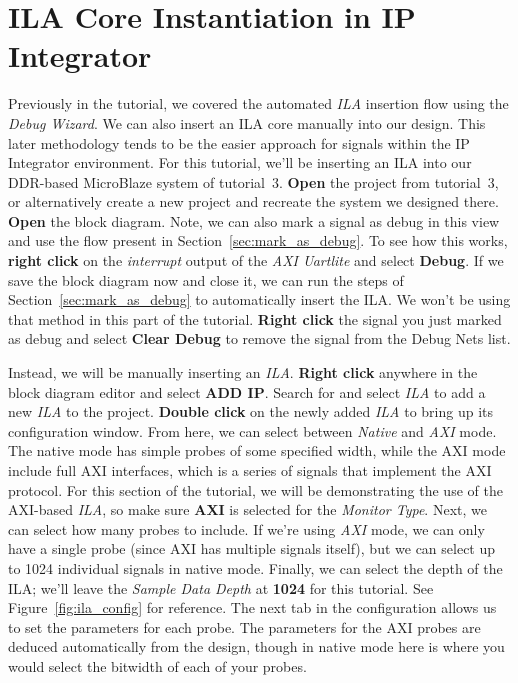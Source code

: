 \documentclass[11pt]{article}
\begin{document}
\section{ILA Core Instantiation in IP Integrator}
\label{sec:ila_core}
Previously in the tutorial, we covered the automated \textit{ILA} insertion flow using the \textit{Debug Wizard}. We can also insert an ILA core manually into our design. This later methodology tends to be the easier approach for signals within the IP Integrator environment. For this tutorial, we'll be inserting an ILA into our DDR-based MicroBlaze system of tutorial~3. \textbf{Open} the project from tutorial~3, or alternatively create a new project and recreate the system we designed there. \textbf{Open} the block diagram. Note, we can also mark a signal as debug in this view and use the flow present in Section~\ref{sec:mark_as_debug}. To see how this works, \textbf{right click} on the \textit{interrupt} output of the \textit{AXI Uartlite} and select \textbf{Debug}. If we save the block diagram now and close it, we can run the steps of Section~\ref{sec:mark_as_debug} to automatically insert the ILA. We won't be using that method in this part of the tutorial. \textbf{Right click} the signal you just marked as debug and select \textbf{Clear Debug} to remove the signal from the Debug Nets list.

Instead, we will be manually inserting an \textit{ILA}. \textbf{Right click} anywhere in the block diagram editor and select \textbf{ADD IP}. Search for and select \textit{ILA} to add a new \textit{ILA} to the project. \textbf{Double click} on the newly added \textit{ILA} to bring up its configuration window. From here, we can select between \textit{Native} and \textit{AXI} mode. The native mode has simple probes of some specified width, while the AXI mode include full AXI interfaces, which is a series of signals that implement the AXI protocol. For this section of the tutorial, we will be demonstrating the use of the AXI-based \textit{ILA}, so make sure \textbf{AXI} is selected for the \textit{Monitor Type}. Next, we can select how many probes to include. If we're using \textit{AXI} mode, we can only have a single probe (since AXI has multiple signals itself), but we can select up to 1024 individual signals in native mode. Finally, we can select the depth of the ILA; we'll leave the \textit{Sample Data Depth} at \textbf{1024} for this tutorial. See Figure~\ref{fig:ila_config} for reference. The next tab in the configuration allows us to set the parameters for each probe. The parameters for the AXI probes are deduced automatically from the design, though in native mode here is where you would select the bitwidth of each of your probes.
\end{document}
